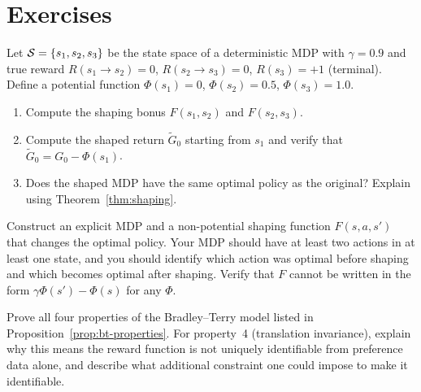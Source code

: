 \section*{Exercises}

\begin{exercise}
\label{ex:shaping-1}
Let $\mathcal{S} = \{s_1, s_2, s_3\}$ be the state space of a deterministic MDP with $\gamma = 0.9$ and true reward $R(s_1 \to s_2) = 0$, $R(s_2 \to s_3) = 0$, $R(s_3) = +1$ (terminal). Define a potential function $\Phi(s_1) = 0$, $\Phi(s_2) = 0.5$, $\Phi(s_3) = 1.0$.
\begin{enumerate}
  \item Compute the shaping bonus $F(s_1, s_2)$ and $F(s_2, s_3)$.
  \item Compute the shaped return $\tilde{G}_0$ starting from $s_1$ and verify that $\tilde{G}_0 = G_0 - \Phi(s_1)$.
  \item Does the shaped MDP have the same optimal policy as the original? Explain using Theorem~\ref{thm:shaping}.
\end{enumerate}
\end{exercise}

\begin{exercise}
\label{ex:shaping-non-potential}
Construct an explicit MDP and a non-potential shaping function $F(s,a,s')$ that changes the optimal policy. Your MDP should have at least two actions in at least one state, and you should identify which action was optimal before shaping and which becomes optimal after shaping. Verify that $F$ cannot be written in the form $\gamma\Phi(s') - \Phi(s)$ for any $\Phi$.
\end{exercise}

\begin{exercise}
\label{ex:bt-properties}
Prove all four properties of the Bradley--Terry model listed in Proposition~\ref{prop:bt-properties}. For property~4 (translation invariance), explain why this means the reward function is not uniquely identifiable from preference data alone, and describe what additional constraint one could impose to make it identifiable.
\end{exercise}

